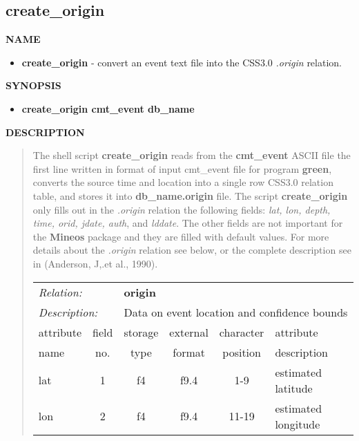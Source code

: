 \subsection{create\_origin}
\vred
{\bf NAME}
\vred
\begin{itemize}
\vred
\item[] {\bf create\_origin} - convert an event text file into the CSS3.0 {\it .origin} relation.
\vred
\end{itemize}
\vred
{\bf SYNOPSIS}
\vred
\begin{itemize}
\vred
\item[] {\bf create\_origin cmt\_event db\_name}
\end{itemize}
\vred
{\bf DESCRIPTION}
\vred
\begin{quote}
\vred
The shell script {\bf create\_origin} reads from the {\bf cmt\_event} ASCII 
file the first line written in format of input cmt\_event file for 
program {\bf green}, converts the source time and location into a single row 
CSS3.0 relation table, and stores it into {\bf db\_name.origin} file.
The script {\bf create\_origin} only fills out in the {\it .origin} relation 
the following fields: {\it lat, lon, depth, time, orid, jdate, auth}, and
{\it lddate}. The other fields are not important for the {\bf Mineos} package
and they are filled with default values. For more details about the {\it .origin}
relation see below, or the complete description see in (Anderson, J,.et al., 1990).
\vred
\begin{center}
\begin{tabular*}{1.0\textwidth}{@{\extracolsep{\fill}}|lccccl|}  \hline
\multicolumn{2}{|l}{{\it Relation:}} & \multicolumn{4}{l|}{{\bf origin}} \\
\multicolumn{2}{|l}{{\it Description:}} & \multicolumn{4}{l|}{Data on event location and confidence bounds} \\ \cline{1-6}
\multicolumn{1}{|l}{attribute \vspace{-0.07 in}} & \multicolumn{1}{c}{field} & \multicolumn{1}{c}{storage} & \multicolumn{1}{c}{external} & \multicolumn{1}{c}{character} & \multicolumn{1}{l|}{attribute} \\
\multicolumn{1}{|l}{name} &  \multicolumn{1}{c}{no.} & \multicolumn{1}{c}{type} & \multicolumn{1}{c}{format} & \multicolumn{1}{c}{position} & \multicolumn{1}{l|}{description} \\ \hline\hline
lat       &  1 & f4  &  f9.4 & 1-9     & estimated latitude \\
lon       &  2 & f4  &  f9.4 & 11-19   & estimated longitude \\

\end{tabular*}
\end{center}
\end{quote}

